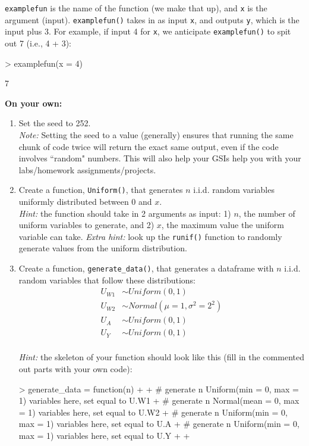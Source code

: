 \documentclass[answers]{exam}
\begin{document}
\texttt{examplefun} is the name of the function (we make that up), and \texttt{x} is the argument (input). \texttt{examplefun()} takes in as input \texttt{x}, and outputs \texttt{y}, which is the input plus 3. For example, if input 4 for \texttt{x}, we anticipate \texttt{examplefun()} to spit out 7 (i.e., 4 + 3):

\begin{Schunk}
\begin{Sinput}
> examplefun(x = 4)
\end{Sinput}
\begin{Soutput}
[1] 7
\end{Soutput}
\end{Schunk}


\noindent\textbf{On your own:}

\begin{enumerate}
\item Set the seed to 252. \\
\textit{Note:} Setting the seed to a value (generally) ensures that running the same chunk of code twice will return the exact same output, even if the code involves ``random" numbers. This will also help your GSIs help you with your labs/homework assignments/projects.
\item Create a function, \texttt{Uniform()}, that generates $n$ i.i.d. random variables uniformly distributed between 0 and $x$. \\
\textit{Hint:} the function should take in 2 arguments as input: 1) $n$, the number of uniform variables to generate, and 2) $x$, the maximum value the uniform variable can take. \textit{Extra hint:} look up the \texttt{runif()} function to randomly generate values from the uniform distribution.
\item Create a function, \texttt{generate\_data()}, that generates a dataframe with $n$ i.i.d. random variables that follow these distributions:\\
\begin{align*}
U_{W1}&\sim Uniform(0,1) \\
U_{W2}& \sim Normal(\mu=1, \sigma^2=2^2)\\
U_{A} &\sim Uniform(0,1)\\
U_{Y} &\sim Uniform(0,1)\\
\end{align*}

\textit{Hint:} the skeleton of your function should look like this (fill in the commented out parts with your own code):
\begin{Schunk}
\begin{Sinput}
> generate_data = function(n) {
+   
+   # generate n Uniform(min = 0, max = 1) variables here, set equal to U.W1
+   # generate n Normal(mean = 0, max = 1) variables here, set equal to U.W2
+   # generate n Uniform(min = 0, max = 1) variables here, set equal to U.A
+   # generate n Uniform(min = 0, max = 1) variables here, set equal to U.Y
+   
+ }
\end{Sinput}
\end{Schunk}


\end{enumerate}
\end{document}

